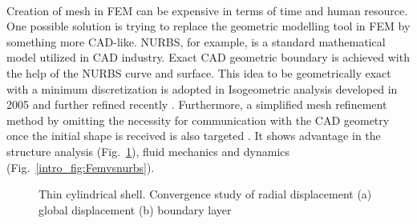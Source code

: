 \paragraph{}
Creation of mesh in FEM can be expensive in terms of time and human resource.
One possible solution is trying to replace the geometric modelling tool in FEM by something more CAD-like.
NURBS, for example, is a standard mathematical model utilized in CAD industry.
Exact CAD geometric boundary is achieved with the help of the NURBS curve and surface.
This idea to be geometrically exact with a minimum discretization is adopted in Isogeometric analysis developed in 2005 \citep{Hug2005b} and further refined recently \citep{Zhang2007,Hug2005b,Cot2006,Cot2009,Baz2006a,Baz2006b}.
Furthermore, a simplified mesh refinement method by omitting the necessity for communication with the CAD geometry once the initial shape is received is also targeted \citep{Cot2007}.
It shows advantage in the structure analysis (Fig.~\ref{intro_fig:thinshell}), fluid mechanics \citep{Buf2011} and dynamics (Fig.~\ref{intro_fig:Femvsnurbs}).
%
\begin{figure}
    \centering
    \caption[Thin cylindrical shell]{Thin cylindrical shell. Convergence study of radial displacement (a) global displacement  (b) boundary layer \citep{Hug2005}}
    \label{intro_fig:thinshell}
\end{figure}
